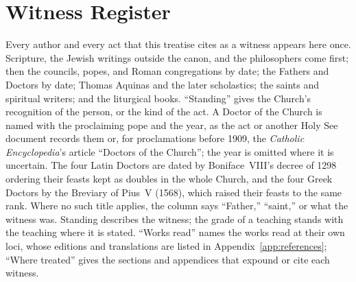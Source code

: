 \section{Witness Register}\label{app:witnesses}

Every author and every act that this treatise cites as a witness appears
here once. Scripture, the Jewish writings outside the canon, and the
philosophers come first; then the councils, popes, and Roman congregations
by date; the Fathers and Doctors by date; Thomas Aquinas and the later
scholastics; the saints and spiritual writers; and the liturgical books.
``Standing'' gives the Church's recognition of the person, or the kind of
the act. A Doctor of the Church is named with the proclaiming pope and the
year, as the act or another Holy See document records them or, for
proclamations before 1909, the \emph{Catholic Encyclopedia}'s article
``Doctors of the Church''; the year is omitted where it is uncertain. The four Latin Doctors are dated by
Boniface~VIII's decree of 1298 ordering their feasts kept as doubles in
the whole Church, and the four Greek Doctors by the Breviary of Pius~V
(1568), which raised their feasts to the same rank. Where no such title
applies, the column says ``Father,'' ``saint,'' or what the witness was.
Standing describes the witness; the grade of a teaching stands with the
teaching where it is stated. ``Works read'' names the works read at their
own loci, whose editions and translations are listed in
Appendix~\ref{app:references}; ``Where treated'' gives the sections and
appendices that expound or cite each witness.


